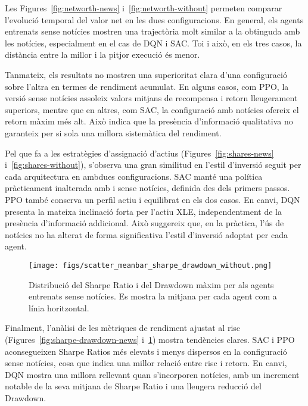 \documentclass[12pt,a4paper,twoside]{book}
\begin{document}
Les Figures~\ref{fig:networth-news} i~\ref{fig:networth-without} permeten comparar l’evolució temporal del valor net en les dues configuracions. En general, els agents entrenats sense notícies mostren una trajectòria molt similar a la obtinguda amb les notícies, especialment en el cas de DQN i SAC. Toi i això, en els tres casos, la distància entre la millor i la pitjor execució és menor.

Tanmateix, els resultats no mostren una superioritat clara d’una configuració sobre l’altra en termes de rendiment acumulat. En alguns casos, com PPO, la versió sense notícies assoleix valors mitjans de recompensa i retorn lleugerament superiors, mentre que en altres, com SAC, la configuració amb notícies ofereix el retorn màxim més alt. Això indica que la presència d'informació qualitativa no garanteix per si sola una millora sistemàtica del rendiment.

Pel que fa a les estratègies d’assignació d’actius (Figures~\ref{fig:shares-news} i~\ref{fig:shares-without}), s’observa una gran similitud en l’estil d’inversió seguit per cada arquitectura en ambdues configuracions. SAC manté una política pràcticament inalterada amb i sense notícies, definida des dels primers passos. PPO també conserva un perfil actiu i equilibrat en els dos casos. En canvi, DQN presenta la mateixa inclinació forta per l’actiu XLE, independentment de la presència d’informació addicional. Això suggereix que, en la pràctica, l'ús de notícies no ha alterat de forma significativa l’estil d’inversió adoptat per cada agent.

\begin{figure}[H]
\centering
\texttt{[image: figs/scatter\_meanbar\_sharpe\_drawdown\_without.png]}
\caption{Distribució del Sharpe Ratio i del Drawdown màxim per als agents entrenats sense notícies. Es mostra la mitjana per cada agent com a línia horitzontal.}
\label{fig:sharpe-drawdown-without}
\end{figure}

Finalment, l’anàlisi de les mètriques de rendiment ajustat al risc (Figures~\ref{fig:sharpe-drawdown-news} i~\ref{fig:sharpe-drawdown-without}) mostra tendències clares. SAC i PPO aconsegueixen Sharpe Ratios més elevats i menys dispersos en la configuració sense notícies, cosa que indica una millor relació entre risc i retorn. En canvi, DQN mostra una millora rellevant quan s’incorporen notícies, amb un increment notable de la seva mitjana de Sharpe Ratio i una lleugera reducció del Drawdown.
\end{document}

